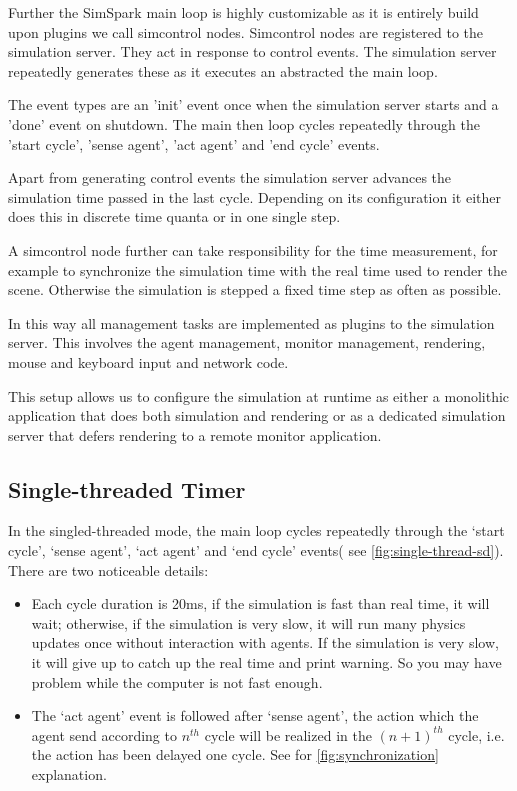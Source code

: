 Further the SimSpark main loop is highly customizable as it is
entirely build upon plugins we call simcontrol nodes. Simcontrol nodes
are registered to the simulation server. They act in response to
control events. The simulation server repeatedly generates these as it
executes an abstracted the main loop.

The event types are an 'init' event once when the simulation server
starts and a 'done' event on shutdown. The main then loop cycles
repeatedly through the 'start cycle', 'sense agent', 'act agent' and
'end cycle' events.

Apart from generating control events the simulation server advances
the simulation time passed in the last cycle. Depending on its
configuration it either does this in discrete time quanta or in one
single step.

A simcontrol node further can take responsibility for the time
measurement, for example to synchronize the simulation time with the
real time used to render the scene.  Otherwise the simulation is
stepped a fixed time step as often as possible.

In this way all management tasks are implemented as plugins to the
simulation server. This involves the agent management, monitor
management, rendering, mouse and keyboard input and network code.

This setup allows us to configure the simulation at runtime as either
a monolithic application that does both simulation and rendering or as
a dedicated simulation server that defers rendering to a remote
monitor application.

\subsection{Single-threaded Timer}

In the singled-threaded mode, the main loop cycles repeatedly through
the `start cycle', `sense agent', `act agent' and `end cycle' events(
see \autoref{fig:single-thread-sd}). There are two noticeable details:
\begin{itemize}
\item Each cycle duration is 20ms, if the simulation is fast than real
  time, it will wait; otherwise, if the simulation is very slow, it
  will run many physics updates once without interaction with agents.
  If the simulation is very slow, it will give up to catch up the real
  time and print warning. So you may have problem while the computer
  is not fast enough.
\item The `act agent' event is followed after `sense agent', the
  action which the agent send according to $n^{th}$ cycle will be
  realized in the $(n+1)^{th}$ cycle, i.e. the action has been delayed
  one cycle. See for \autoref{fig:synchronization} explanation.
\end{itemize}

